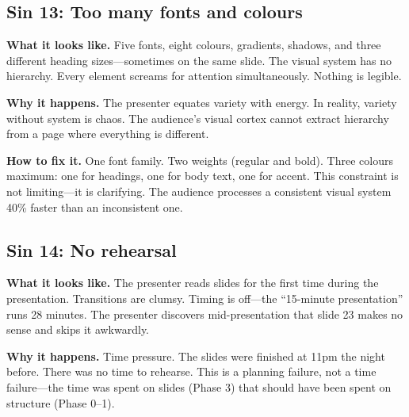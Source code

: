 
\subsection{Sin 13: Too many fonts and colours}

\textbf{What it looks like.} Five fonts, eight colours, gradients, shadows, and three different heading sizes---sometimes on the same slide. The visual system has no hierarchy. Every element screams for attention simultaneously. Nothing is legible.

\textbf{Why it happens.} The presenter equates variety with energy. In reality, variety without system is chaos. The audience's visual cortex cannot extract hierarchy from a page where everything is different.

\textbf{How to fix it.} One font family. Two weights (regular and bold). Three colours maximum: one for headings, one for body text, one for accent. This constraint is not limiting---it is clarifying. The audience processes a consistent visual system 40\% faster than an inconsistent one.


\subsection{Sin 14: No rehearsal}

\textbf{What it looks like.} The presenter reads slides for the first time during the presentation. Transitions are clumsy. Timing is off---the ``15-minute presentation'' runs 28 minutes. The presenter discovers mid-presentation that slide 23 makes no sense and skips it awkwardly.

\textbf{Why it happens.} Time pressure. The slides were finished at 11pm the night before. There was no time to rehearse. This is a planning failure, not a time failure---the time was spent on slides (Phase 3) that should have been spent on structure (Phase 0--1).

